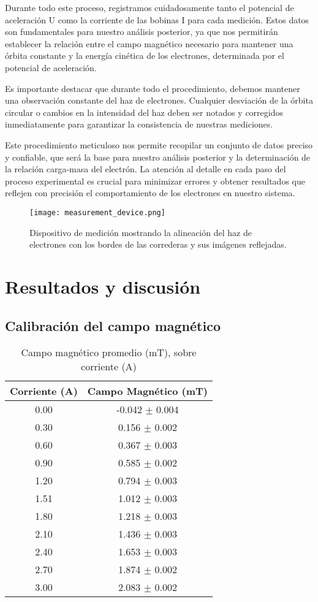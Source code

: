 \documentclass[twocolumn,a4paper,11pt]{scrartcl}
\begin{document}
Durante todo este proceso, registramos cuidadosamente tanto el potencial de aceleración U como la corriente de las bobinas I para cada medición. Estos datos son fundamentales para nuestro análisis posterior, ya que nos permitirán establecer la relación entre el campo magnético necesario para mantener una órbita constante y la energía cinética de los electrones, determinada por el potencial de aceleración.

Es importante destacar que durante todo el procedimiento, debemos mantener una observación constante del haz de electrones. Cualquier desviación de la órbita circular o cambios en la intensidad del haz deben ser notados y corregidos inmediatamente para garantizar la consistencia de nuestras mediciones.

Este procedimiento meticuloso nos permite recopilar un conjunto de datos preciso y confiable, que será la base para nuestro análisis posterior y la determinación de la relación carga-masa del electrón. La atención al detalle en cada paso del proceso experimental es crucial para minimizar errores y obtener resultados que reflejen con precisión el comportamiento de los electrones en nuestro sistema.

\begin{figure}[h]
    \centering
    \texttt{[image: measurement\_device.png]}
    \caption{Dispositivo de medición mostrando la alineación del haz de electrones con los bordes de las correderas y sus imágenes reflejadas.}
    \label{fig:measurement_device}
\end{figure}

\section{Resultados y discusión}
\subsection*{Calibración del campo magnético}

\begin{table}[h!]
\centering
\begin{tabular}{ |c| c | } 
\hline
Corriente (A) & Campo Magnético (mT) \\ 
\hline
0.00 & -0.042 $\pm$ 0.004 \\ 
0.30 & 0.156 $\pm$ 0.002 \\ 
0.60 & 0.367 $\pm$ 0.003 \\ 
0.90 & 0.585 $\pm$ 0.002 \\ 
1.20 & 0.794 $\pm$ 0.003 \\ 
1.51 & 1.012 $\pm$ 0.003 \\ 
1.80 & 1.218 $\pm$ 0.003 \\ 
2.10 & 1.436 $\pm$ 0.003 \\ 
2.40 & 1.653 $\pm$ 0.003 \\ 
2.70 & 1.874 $\pm$ 0.002 \\ 
3.00 & 2.083 $\pm$ 0.002 \\ 
\hline
\end{tabular}
\caption{Campo magnético promedio (mT), sobre corriente (A)}
\label{tabla:AT}
\end{table}
\end{document}
